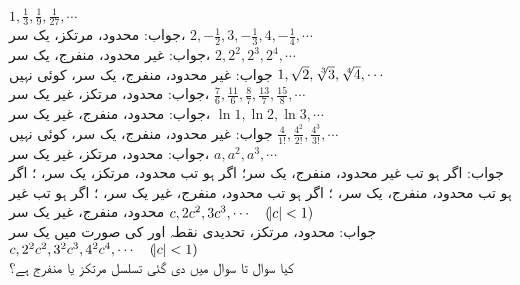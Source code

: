 \quad
$1,\tfrac{1}{3},\tfrac{1}{9},\tfrac{1}{27},\cdots$\\
جواب:\quad
محدود، مرتکز، یک سر، 
\quad
$2,-\tfrac{1}{2},3,-\tfrac{1}{3},4,-\tfrac{1}{4},\cdots$\\
جواب:\quad
غیر محدود، منفرج، یک سر، 
\quad
$2,2^2,2^3,2^4,\cdots$\\
جواب:\quad
غیر محدود، منفرج، یک سر، کوئی نہیں
\quad
$1,\sqrt{2},\sqrt[\leftroot{-2}3]3,\sqrt[\leftroot{-2}4]4,\cdots$\\
جواب:\quad
محدود، مرتکز، غیر یک سر، 
\quad
$\tfrac{7}{6},\tfrac{11}{6},\tfrac{8}{7},\tfrac{13}{7},\tfrac{15}{8},\cdots$\\
جواب:\quad
محدود، منفرج، غیر یک سر، 
\quad
$\ln 1, \ln 2,\ln 3,\cdots$\\
جواب:\quad
غیر محدود، منفرج، یک سر، کوئی نہیں
\quad
$\tfrac{4}{1!},\tfrac{4^2}{2!},\tfrac{4^3}{3!},\cdots$\\
جواب:\quad
محدود، مرتکز، غیر یک سر، 
\quad
$a,a^2,a^3,\cdots$\\
جواب:\quad
اگر  ہو تب غیر محدود، منفرج، یک سر؛ اگر  ہو تب محدود، مرتکز، یک سر، ؛ اگر  ہو تب محدود، منفرج، یک سر، ؛ اگر  ہو تب محدود، منفرج، غیر یک سر، ؛ اگر  ہو تب غیر محدود، منفرج، غیر یک سر  
\quad
$c, 2c^2,3c^3,\cdots \quad (\abs{c}<1)$\\
جواب:\quad
محدود، مرتکز، تحدیدی نقطہ  اور  کی صورت میں یک سر
\quad
$c,2^2c^2, 3^2c^3,4^2c^4,\cdots\quad (\abs{c}<1)$\\
کیا سوال  تا سوال  میں دی گئی تسلسل مرتکز یا منفرج ہے؟

